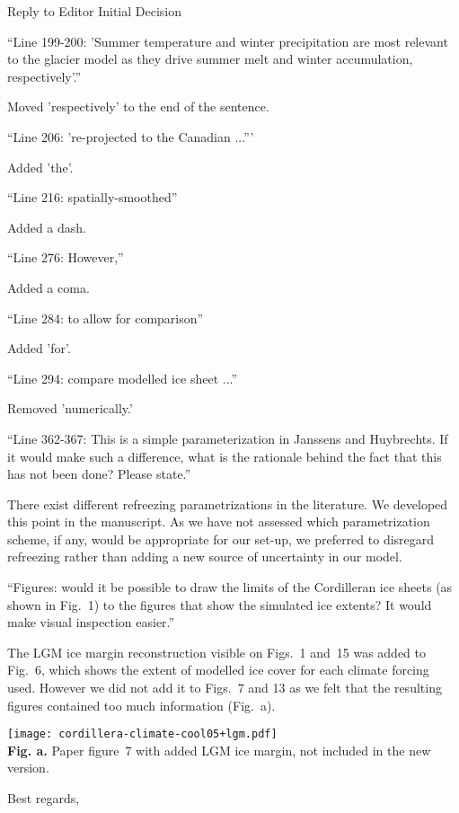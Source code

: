 \documentclass{letter}
\newcommand{\rev}[0]{\color{blue!50!black}\it}
\newcommand{\revpoint}[1]{{\rev\item``#1''}}
\begin{document}
\begin{letter}{Reply to Editor Initial Decision}
\begin{itemize}
\revpoint{Line 199-200: 'Summer temperature and winter precipitation are most relevant to the glacier model as they drive summer melt and winter accumulation, respectively'.}

Moved 'respectively' to the end of the sentence.

\revpoint{Line 206: 're-projected to the Canadian ...'}

Added 'the'.

\revpoint{Line 216: spatially-smoothed}

Added a dash.

\revpoint{Line 276: However,}

Added a coma.

\revpoint{Line 284: to allow for comparison}

Added 'for'.

\revpoint{Line 294: compare modelled ice sheet ...}

Removed 'numerically.'

\revpoint{Line 362-367: This is a simple parameterization in Janssens and Huybrechts. If it would make such a difference, what is the rationale behind the fact that this has not been done? Please state.}

There exist different refreezing parametrizations in the literature. We developed this point in the manuscript. As we have not assessed which parametrization scheme, if any, would be appropriate for our set-up, we preferred to disregard refreezing rather than adding a new source of uncertainty in our model.

\revpoint{Figures: would it be possible to draw the limits of the Cordilleran ice sheets (as shown in Fig.~1) to the figures that show the simulated ice extents? It would make visual inspection easier.}

The LGM ice margin reconstruction visible on Figs.~1 and~15 was added to Fig.~6, which shows the extent of modelled ice cover for each climate forcing used. However we did not add it to Figs.~7 and 13 as we felt that the resulting figures contained too much information (Fig.~a).

\end{itemize}

\begin{center}
	\texttt{[image: cordillera-climate-cool05+lgm.pdf]}\\
	\textbf{Fig. a.} Paper figure~7 with added LGM ice margin, not included in the new version.
\end{center}


\closing{Best regards,}

\end{letter}
\end{document}

